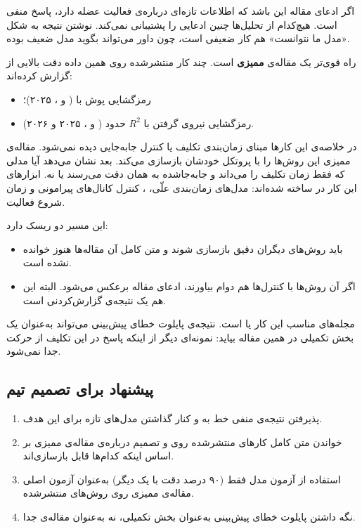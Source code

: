 اگر ادعای مقاله این باشد که  اطلاعات تازه‌ای درباره‌ی فعالیت عضله دارد، پاسخ منفی است. هیچ‌کدام از تحلیل‌ها چنین ادعایی را پشتیبانی نمی‌کند. نوشتن نتیجه به شکل «مدل ما نتوانست» هم کار ضعیفی است، چون داور می‌تواند بگوید مدل ضعیف بوده.

راه قوی‌تر یک مقاله‌ی \textbf{ممیزی} است. چند کار منتشرشده روی همین داده دقت بالایی از  گزارش کرده‌اند:
\begin{itemize}
\item رمزگشایی پوش  با  ( و ، ۲۰۲۵)؛
\item رمزگشایی نیروی گرفتن با $R^2$ حدود  ( و ، ۲۰۲۵ و ۲۰۲۶).
\end{itemize}
در خلاصه‌ی این کارها مبنای زمان‌بندی تکلیف یا کنترل جابه‌جایی  دیده نمی‌شود. مقاله‌ی ممیزی این روش‌ها را با پروتکل خودشان بازسازی می‌کند. بعد نشان می‌دهد آیا مدلی که فقط زمان تکلیف را می‌داند و  جابه‌جاشده به همان دقت می‌رسند یا نه. ابزارهای این کار در  ساخته شده‌اند: مدل‌های زمان‌بندی علّی، ، کنترل کانال‌های پیرامونی و زمان شروع فعالیت.

این مسیر دو ریسک دارد:
\begin{itemize}
\item باید روش‌های دیگران دقیق بازسازی شوند و متن کامل آن مقاله‌ها هنوز خوانده نشده است.
\item اگر آن روش‌ها با کنترل‌ها هم دوام بیاورند، ادعای مقاله برعکس می‌شود. البته این هم یک نتیجه‌ی گزارش‌کردنی است.
\end{itemize}
مجله‌های مناسب این کار  یا  است. نتیجه‌ی پایلوت خطای پیش‌بینی می‌تواند به‌عنوان یک بخش تکمیلی در همین مقاله بیاید: نمونه‌ای دیگر از اینکه پاسخ  در این تکلیف از حرکت جدا نمی‌شود.

\subsection{پیشنهاد برای تصمیم تیم}

\begin{enumerate}
\item پذیرفتن نتیجه‌ی منفی خط  به  و کنار گذاشتن مدل‌های تازه برای این هدف.
\item خواندن متن کامل کارهای منتشرشده روی  و تصمیم درباره‌ی مقاله‌ی ممیزی بر اساس اینکه کدام‌ها قابل بازسازی‌اند.
\item استفاده از آزمون  مدل فقط‌ (۹۰ درصد دقت با  یک  دیگر) به‌عنوان آزمون اصلی مقاله‌ی ممیزی روی روش‌های منتشرشده.
\item نگه داشتن پایلوت خطای پیش‌بینی به‌عنوان بخش تکمیلی، نه به‌عنوان مقاله‌ی جدا.
\end{enumerate}
